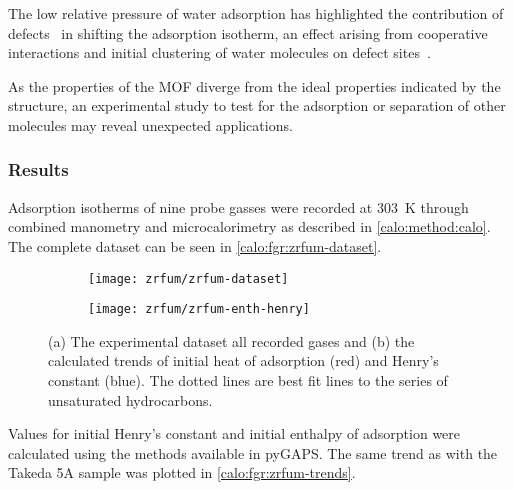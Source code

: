 The low relative pressure of water adsorption has highlighted
the contribution of defects~\cite{choiRoleStructuralDefects2018} in 
shifting the adsorption isotherm, an effect arising from cooperative
interactions and initial clustering of water molecules on defect
sites~\cite{vandichelWaterCoordinationDehydration2016}.

As the properties of the MOF diverge from the ideal properties
indicated by the structure, an experimental study to test for the adsorption
or separation of other molecules may reveal unexpected 
applications.

\subsubsection{Results}

Adsorption isotherms of nine probe gasses were recorded at 
\SI{303}{\kelvin} through combined manometry and microcalorimetry
as described in \autoref{calo:method:calo}. The complete 
dataset can be seen in \autoref{calo:fgr:zrfum-dataset}.

\begin{figure}[htb]
    \centering

    \begin{subfigure}[b]{0.5\textwidth}
        \centering
        \texttt{[image: zrfum/zrfum-dataset]}
        \caption{}%
        \label{calo:fgr:zrfum-dataset}
    \end{subfigure}%
    \begin{subfigure}[b]{0.5\textwidth}
        \centering
        \texttt{[image: zrfum/zrfum-enth-henry]}
        \caption{}%
        \label{calo:fgr:zrfum-trends}
    \end{subfigure}
    \caption{(a) The experimental dataset all recorded gases and
    (b) the calculated trends of initial heat of adsorption (red) and 
    Henry's constant (blue). The dotted lines are best fit lines to 
    the series of unsaturated hydrocarbons.}%
    \label{calo:fgr:zrfum-analysis}

\end{figure}

Values for initial Henry's constant and initial enthalpy of adsorption
were calculated using the methods available in pyGAPS.
The same trend as with the Takeda 5A sample was plotted in 
\autoref{calo:fgr:zrfum-trends}. 
